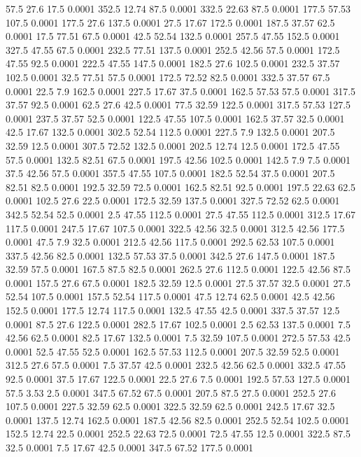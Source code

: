 57.5	27.6	17.5	0.0001
352.5	12.74	87.5	0.0001
332.5	22.63	87.5	0.0001
177.5	57.53	107.5	0.0001
177.5	27.6	137.5	0.0001
27.5	17.67	172.5	0.0001
187.5	37.57	62.5	0.0001
17.5	77.51	67.5	0.0001
42.5	52.54	132.5	0.0001
257.5	47.55	152.5	0.0001
327.5	47.55	67.5	0.0001
232.5	77.51	137.5	0.0001
252.5	42.56	57.5	0.0001
172.5	47.55	92.5	0.0001
222.5	47.55	147.5	0.0001
182.5	27.6	102.5	0.0001
232.5	37.57	102.5	0.0001
32.5	77.51	57.5	0.0001
172.5	72.52	82.5	0.0001
332.5	37.57	67.5	0.0001
22.5	7.9	162.5	0.0001
227.5	17.67	37.5	0.0001
162.5	57.53	57.5	0.0001
317.5	37.57	92.5	0.0001
62.5	27.6	42.5	0.0001
77.5	32.59	122.5	0.0001
317.5	57.53	127.5	0.0001
237.5	37.57	52.5	0.0001
122.5	47.55	107.5	0.0001
162.5	37.57	32.5	0.0001
42.5	17.67	132.5	0.0001
302.5	52.54	112.5	0.0001
227.5	7.9	132.5	0.0001
207.5	32.59	12.5	0.0001
307.5	72.52	132.5	0.0001
202.5	12.74	12.5	0.0001
172.5	47.55	57.5	0.0001
132.5	82.51	67.5	0.0001
197.5	42.56	102.5	0.0001
142.5	7.9	7.5	0.0001
37.5	42.56	57.5	0.0001
357.5	47.55	107.5	0.0001
182.5	52.54	37.5	0.0001
207.5	82.51	82.5	0.0001
192.5	32.59	72.5	0.0001
162.5	82.51	92.5	0.0001
197.5	22.63	62.5	0.0001
102.5	27.6	22.5	0.0001
172.5	32.59	137.5	0.0001
327.5	72.52	62.5	0.0001
342.5	52.54	52.5	0.0001
2.5	47.55	112.5	0.0001
27.5	47.55	112.5	0.0001
312.5	17.67	117.5	0.0001
247.5	17.67	107.5	0.0001
322.5	42.56	32.5	0.0001
312.5	42.56	177.5	0.0001
47.5	7.9	32.5	0.0001
212.5	42.56	117.5	0.0001
292.5	62.53	107.5	0.0001
337.5	42.56	82.5	0.0001
132.5	57.53	37.5	0.0001
342.5	27.6	147.5	0.0001
187.5	32.59	57.5	0.0001
167.5	87.5	82.5	0.0001
262.5	27.6	112.5	0.0001
122.5	42.56	87.5	0.0001
157.5	27.6	67.5	0.0001
182.5	32.59	12.5	0.0001
27.5	37.57	32.5	0.0001
27.5	52.54	107.5	0.0001
157.5	52.54	117.5	0.0001
47.5	12.74	62.5	0.0001
42.5	42.56	152.5	0.0001
177.5	12.74	117.5	0.0001
132.5	47.55	42.5	0.0001
337.5	37.57	12.5	0.0001
87.5	27.6	122.5	0.0001
282.5	17.67	102.5	0.0001
2.5	62.53	137.5	0.0001
7.5	42.56	62.5	0.0001
82.5	17.67	132.5	0.0001
7.5	32.59	107.5	0.0001
272.5	57.53	42.5	0.0001
52.5	47.55	52.5	0.0001
162.5	57.53	112.5	0.0001
207.5	32.59	52.5	0.0001
312.5	27.6	57.5	0.0001
7.5	37.57	42.5	0.0001
232.5	42.56	62.5	0.0001
332.5	47.55	92.5	0.0001
37.5	17.67	122.5	0.0001
22.5	27.6	7.5	0.0001
192.5	57.53	127.5	0.0001
57.5	3.53	2.5	0.0001
347.5	67.52	67.5	0.0001
207.5	87.5	27.5	0.0001
252.5	27.6	107.5	0.0001
227.5	32.59	62.5	0.0001
322.5	32.59	62.5	0.0001
242.5	17.67	32.5	0.0001
137.5	12.74	162.5	0.0001
187.5	42.56	82.5	0.0001
252.5	52.54	102.5	0.0001
152.5	12.74	22.5	0.0001
252.5	22.63	72.5	0.0001
72.5	47.55	12.5	0.0001
322.5	87.5	32.5	0.0001
7.5	17.67	42.5	0.0001
347.5	67.52	177.5	0.0001
